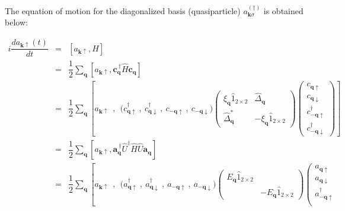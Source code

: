\documentclass[uplatex,a4j,12pt,dvipdfmx]{jsarticle}
\begin{document}
The equation of motion for the diagonalized basis (quasiparticle) $a_{\bm{k} \sigma}^{(\dagger)}$
is obtained below:

\begin{eqnarray}
	i \dfrac{d a_{\bm{k}\uparrow}(t)}{dt}
	&=&
	\left[ a_{\bm{k}\uparrow} , H \right]
	\nonumber \\[2mm] &=&
	\dfrac{1}{2}
	\sum_{\bm{q}}
	\left[ a_{\bm{k}\uparrow} , \bm{c}_{\bm{q}}^{\ \dagger} \hat{H} \bm{c}_{\bm{q}} \right]
	\nonumber \\[2mm] &=&
	\dfrac{1}{2}
	\sum_{\bm{q}}
	\left[ a_{\bm{k}\uparrow}
		\ \ , \ \
		\big( c^{\dagger}_{\bm{q} \uparrow} \ , \ c^{\dagger}_{\bm{q} \downarrow} \ , \ c_{-\bm{q} \uparrow} \ , \ c_{-\bm{q} \downarrow}  \big)
		\!\!\!
		\left(
		\begin{array}{cc}
				\xi_{\bm{q}} \hat{1}_{2 \times 2} & \hat{\Delta}_{\bm{q}}               \\[3mm]
				\hat{\Delta}^{*}_{\bm{q}}         & - \xi_{\bm{q}} \hat{1}_{2 \times 2}
			\end{array}
		\right)
		\!\!\!
		\left(
		\begin{array}{c}
				c_{\bm{q} \uparrow}            \\[2mm]
				c_{\bm{q} \downarrow}          \\[2mm]
				c^{\dagger}_{-\bm{q} \uparrow} \\[2mm]
				c^{\dagger}_{-\bm{q} \downarrow}
			\end{array}
		\right)
		\right]
	\nonumber \\[2mm] &=&
	\dfrac{1}{2}
	\sum_{\bm{q}}
	\left[ a_{\bm{k}\uparrow} , \bm{a}_{\bm{q}}^{\ \dagger} \hat{U}^{\dagger} \hat{H} \hat{U} \bm{a}_{\bm{q}} \right]
	\nonumber \\[2mm] &=&
	\dfrac{1}{2}
	\sum_{\bm{q}}
	\left[ a_{\bm{k}\uparrow}
		\ \ , \ \
		\big( a^{\dagger}_{\bm{q} \uparrow} \ , \ a^{\dagger}_{\bm{q} \downarrow} \ , \ a_{-\bm{q} \uparrow} \ , \ a_{-\bm{q} \downarrow}  \big)
		\!\!\!
		\left(
		\begin{array}{cc}
				E_{\bm{q}} \hat{1}_{2 \times 2} &
				\\[3mm]
				                                & - E_{\bm{q}} \hat{1}_{2 \times 2}
			\end{array}
		\right)
		\!\!\!
		\left(
		\begin{array}{c}
				a_{\bm{q} \uparrow}            \\[2mm]
				a_{\bm{q} \downarrow}          \\[2mm]
				a^{\dagger}_{-\bm{q} \uparrow} \\[2mm]

\end{array}
\end{eqnarray}
\end{document}

